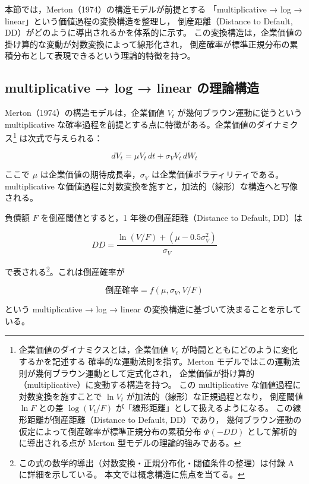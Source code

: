 本節では，Merton（1974）の構造モデルが前提とする
「multiplicative → log → linear」という価値過程の変換構造を整理し，
倒産距離（Distance to Default, DD）がどのように導出されるかを体系的に示す。
この変換構造は，企業価値の掛け算的な変動が対数変換によって線形化され，
倒産確率が標準正規分布の累積分布として表現できるという理論的特徴を持つ。

\subsection{multiplicative → log → linear の理論構造}

Merton（1974）の構造モデルは，企業価値 $V_t$ が幾何ブラウン運動に従うという
multiplicative な確率過程を前提とする点に特徴がある。企業価値のダイナミクス\footnote{
企業価値のダイナミクスとは，企業価値 $V_t$ が時間とともにどのように変化するかを記述する
確率的な運動法則を指す。Merton モデルではこの運動法則が幾何ブラウン運動として定式化され，
企業価値が掛け算的（multiplicative）に変動する構造を持つ。
この multiplicative な価値過程に対数変換を施すことで $\ln V_t$ が加法的（線形）な正規過程となり，
倒産閾値 $\ln F$ との差 $\log(V_t/F)$ が「線形距離」として扱えるようになる。
この線形距離が倒産距離（Distance to Default, DD）であり，
幾何ブラウン運動の仮定によって倒産確率が標準正規分布の累積分布
$\Phi(-DD)$ として解析的に導出される点が Merton 型モデルの理論的強みである。
}
は次式で与えられる：



\[
dV_t = \mu V_t\, dt + \sigma_V V_t\, dW_t
\]



ここで $\mu$ は企業価値の期待成長率，$\sigma_V$ は企業価値ボラティリティである。
multiplicative な価値過程に対数変換を施すと，加法的（線形）な構造へと写像される。

負債額 $F$ を倒産閾値とすると，1 年後の倒産距離（Distance to Default, DD）は



\[
DD = \frac{\ln(V/F) + (\mu - 0.5\sigma_V^2)}{\sigma_V}
\]



で表される\footnote{
この式の数学的導出（対数変換・正規分布化・閾値条件の整理）は付録 A に詳細を示している。
本文では概念構造に焦点を当てる。
}。これは倒産確率が



\[
\text{倒産確率} = f(\mu, \sigma_V, V/F)
\]



という multiplicative → log → linear の変換構造に基づいて決まることを示している。

